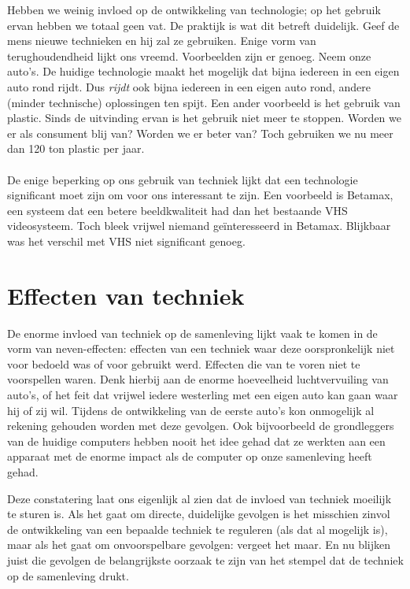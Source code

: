 \documentclass[11pt]{report}
\begin{document}
Hebben we weinig invloed op de ontwikkeling van technologie; op het gebruik ervan hebben we totaal geen vat. De praktijk is wat dit betreft duidelijk. Geef de mens nieuwe technieken en hij zal ze gebruiken. Enige vorm van terughoudendheid lijkt ons vreemd. Voorbeelden zijn er genoeg. Neem onze auto's. De huidige technologie maakt het mogelijk dat bijna iedereen in een eigen auto rond rijdt. Dus \emph{rijdt} ook bijna iedereen in een eigen auto rond, andere (minder technische) oplossingen ten spijt. Een ander voorbeeld is het gebruik van plastic. Sinds de uitvinding ervan is het gebruik niet meer te stoppen. Worden we er als consument blij van? Worden we er beter van? Toch gebruiken we nu meer dan 120 ton plastic per jaar.

\paragraph{}

De enige beperking op ons gebruik van techniek lijkt dat een technologie significant moet zijn om voor ons interessant te zijn. Een voorbeeld is Betamax, een systeem dat een betere beeldkwaliteit had dan het bestaande VHS videosysteem. Toch bleek vrijwel niemand ge\"interesseerd in Betamax. Blijkbaar was het verschil met VHS niet significant genoeg.


\section{Effecten van techniek}

De enorme invloed van techniek op de samenleving lijkt vaak te komen in de vorm van neven-effecten: effecten van een techniek waar deze oorspronkelijk niet voor bedoeld was of voor gebruikt werd. Effecten die van te voren niet te voorspellen waren. Denk hierbij aan de enorme hoeveelheid luchtvervuiling van auto's, of het feit dat vrijwel iedere westerling met een eigen auto kan gaan waar hij of zij wil. Tijdens de ontwikkeling van de eerste auto's kon onmogelijk al rekening gehouden worden met deze gevolgen. Ook bijvoorbeeld de grondleggers van de huidige computers hebben nooit het idee gehad dat ze werkten aan een apparaat met de enorme impact als de computer op onze samenleving heeft gehad.

Deze constatering laat ons eigenlijk al zien dat de invloed van techniek moeilijk te sturen is. Als het gaat om directe, duidelijke gevolgen is het misschien zinvol de ontwikkeling van een bepaalde techniek te reguleren (als dat al mogelijk is), maar als het gaat om onvoorspelbare gevolgen: vergeet het maar. En nu blijken juist die gevolgen de belangrijkste oorzaak te zijn van het stempel dat de techniek op de samenleving drukt.
\end{document}
